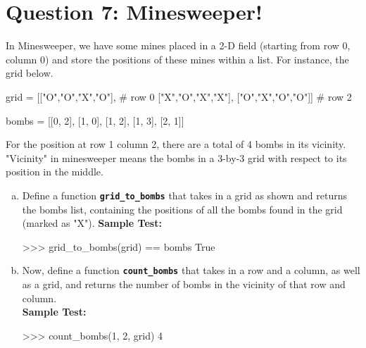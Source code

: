\newpage

\section{Question 7: Minesweeper!}
In Minesweeper, we have some mines placed in a 2-D field (starting from row 0, column
0) and store the positions of these mines within a list. For instance, the grid below.
\begin{python}
grid = [["O","O","X","O"],  # row 0
        ["X","O","X","X"],
        ["O","X","O","O"]]  # row 2

bombs = [[0, 2], [1, 0], [1, 2], [1, 3], [2, 1]]
\end{python}
For the position at row 1 column 2, there are a total of 4 bombs in its vicinity. "Vicinity" in
minesweeper means the bombs in a 3-by-3 grid with respect to its position in the middle.
\begin{enumerate}[(a)]
\item Define a function \texttt{\bfseries grid\_to\_bombs} that takes in a grid as shown and returns the
bombs list, containing the positions of all the bombs found in the grid (marked as "X").
\textbf{Sample Test:}
\begin{python}
>>> grid_to_bombs(grid) == bombs
True
\end{python}

\item Now, define a function \texttt{\bfseries count\_bombs} that takes in a row and a column, as well as a
grid, and returns the number of bombs in the vicinity of that row and column. \\
\textbf{Sample Test:}
\begin{python}
>>> count_bombs(1, 2, grid)
4
\end{python}
\end{enumerate}
